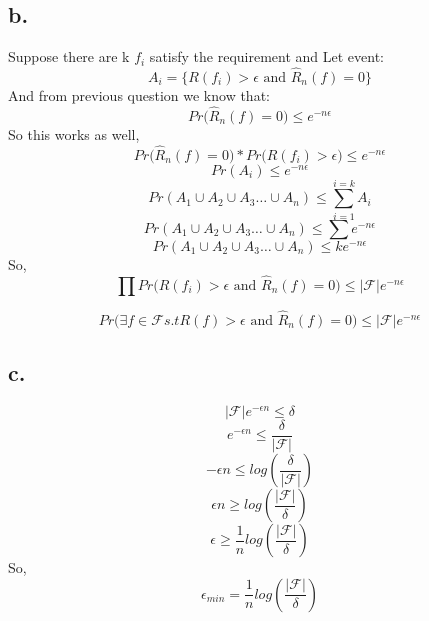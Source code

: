 \documentclass{article}
\begin{document}
\subsection*{b.}
Suppose there are k $f_i$ satisfy the requirement and Let event:
\[ A_i = \{ R(f_i) > \epsilon \text{ and } \hat{R}_n(f) = 0 \} \] 
And from previous question we know that:
\[ Pr\big( \hat{R}_n(f) = 0 \big) \le e^{-n\epsilon} \]
So this works as well,
\[ Pr\big( \hat{R}_n(f) = 0 \big) * Pr\big( R(f_i) > \epsilon \big) \le e^{-n\epsilon} \]
\[ Pr(A_i)  \le e^{-n\epsilon} \]
\[ Pr(A_1 \cup A_2 \cup A_3 \dots \cup A_n)  \le \sum_{i=1}^{i=k} A_i \]
\[ Pr(A_1 \cup A_2 \cup A_3 \dots \cup A_n)  \le \sum e^{-n\epsilon} \]
\[ Pr(A_1 \cup A_2 \cup A_3 \dots \cup A_n)  \le k e^{-n\epsilon} \]
So,
\[ \prod Pr\big( R(f_i) > \epsilon \text{ and } \hat{R}_n(f) =0 \big) \le |\mathcal{F}| e^{-n\epsilon}\]

\[ Pr\big( \exists f \in \mathcal{F} s.t R(f) > \epsilon \text{ and } \hat{R}_n(f) =0 \big) \le |\mathcal{F}| e^{-n\epsilon}\]

\subsection*{c.}

\[ |\mathcal{F}| e^{-\epsilon n} \le \delta  \]
\[ e^{-\epsilon n} \le \frac{\delta}{|\mathcal{F}|} \]
\[ -\epsilon n \le log(\frac{\delta}{|\mathcal{F}|}) \]
\[ \epsilon n \ge log(\frac{|\mathcal{F}|}{\delta}) \]
\[ \epsilon \ge \frac{1}{n} log(\frac{|\mathcal{F}|}{\delta}) \]
So,
\[ \epsilon_{min} = \frac{1}{n} log(\frac{|\mathcal{F}|}{\delta}) \]
\end{document}
